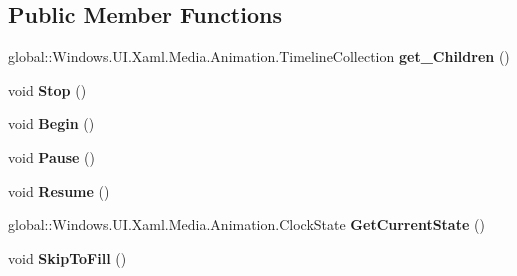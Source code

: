 \subsection*{Public Member Functions}
\begin{DoxyCompactItemize}
\item 
\mbox{\label{class_windows_1_1_u_i_1_1_xaml_1_1_media_1_1_animation_1_1_storyboard_ad0f6b9c0bedc7d1b44d1977fc371c08c}} 
global\+::\+Windows.\+U\+I.\+Xaml.\+Media.\+Animation.\+Timeline\+Collection {\bfseries get\+\_\+\+Children} ()
\item 
\mbox{\label{class_windows_1_1_u_i_1_1_xaml_1_1_media_1_1_animation_1_1_storyboard_aa40e1168c9cf5d0a608c601e86efc278}} 
void {\bfseries Stop} ()
\item 
\mbox{\label{class_windows_1_1_u_i_1_1_xaml_1_1_media_1_1_animation_1_1_storyboard_aebd7156a0b7f433f785472aa73411daa}} 
void {\bfseries Begin} ()
\item 
\mbox{\label{class_windows_1_1_u_i_1_1_xaml_1_1_media_1_1_animation_1_1_storyboard_ae4c08b52d0438fb4e059923d544e8af6}} 
void {\bfseries Pause} ()
\item 
\mbox{\label{class_windows_1_1_u_i_1_1_xaml_1_1_media_1_1_animation_1_1_storyboard_ad18fec80569ba300486c385391f2fc96}} 
void {\bfseries Resume} ()
\item 
\mbox{\label{class_windows_1_1_u_i_1_1_xaml_1_1_media_1_1_animation_1_1_storyboard_a633685fb262335d00b50b36515373160}} 
global\+::\+Windows.\+U\+I.\+Xaml.\+Media.\+Animation.\+Clock\+State {\bfseries Get\+Current\+State} ()
\item 
\mbox{\label{class_windows_1_1_u_i_1_1_xaml_1_1_media_1_1_animation_1_1_storyboard_ac88c93db5e691dd229f0f19a90e80af6}} 
void {\bfseries Skip\+To\+Fill} ()

\end{DoxyCompactItemize}
